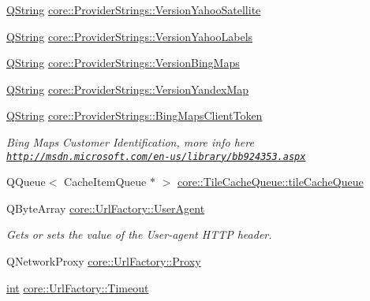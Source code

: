 \begin{DoxyCompactItemize}
\hyperlink{group___u_a_v_objects_plugin_gab9d252f49c333c94a72f97ce3105a32d}{Q\-String} \hyperlink{group___o_p_map_widget_ga41e9afc6aa6f634642d2aaa246c1a60e}{core\-::\-Provider\-Strings\-::\-Version\-Yahoo\-Satellite}
\item 
\hyperlink{group___u_a_v_objects_plugin_gab9d252f49c333c94a72f97ce3105a32d}{Q\-String} \hyperlink{group___o_p_map_widget_gae16013eddeb9d3b70af56f0e03eeab19}{core\-::\-Provider\-Strings\-::\-Version\-Yahoo\-Labels}
\item 
\hyperlink{group___u_a_v_objects_plugin_gab9d252f49c333c94a72f97ce3105a32d}{Q\-String} \hyperlink{group___o_p_map_widget_ga98d1eeb119258d3fb9fab1a550604eb0}{core\-::\-Provider\-Strings\-::\-Version\-Bing\-Maps}
\item 
\hyperlink{group___u_a_v_objects_plugin_gab9d252f49c333c94a72f97ce3105a32d}{Q\-String} \hyperlink{group___o_p_map_widget_ga4e8dc0424dc67c6a4248f5bb6a770403}{core\-::\-Provider\-Strings\-::\-Version\-Yandex\-Map}
\item 
\hyperlink{group___u_a_v_objects_plugin_gab9d252f49c333c94a72f97ce3105a32d}{Q\-String} \hyperlink{group___o_p_map_widget_ga4c3a944c12deba7b13251f0c04685ac6}{core\-::\-Provider\-Strings\-::\-Bing\-Maps\-Client\-Token}
\begin{DoxyCompactList}\small\item\em Bing Maps Customer Identification, more info here \href{http://msdn.microsoft.com/en-us/library/bb924353.aspx}{\tt http\-://msdn.\-microsoft.\-com/en-\/us/library/bb924353.\-aspx} \end{DoxyCompactList}\item 
Q\-Queue$<$ Cache\-Item\-Queue $\ast$ $>$ \hyperlink{group___o_p_map_widget_ga6bb4a109ac678df86dff7fe8a1a02944}{core\-::\-Tile\-Cache\-Queue\-::tile\-Cache\-Queue}
\item 
Q\-Byte\-Array \hyperlink{group___o_p_map_widget_ga9dbf3d049cf1947db76a0c87dd0821fc}{core\-::\-Url\-Factory\-::\-User\-Agent}
\begin{DoxyCompactList}\small\item\em Gets or sets the value of the User-\/agent H\-T\-T\-P header. \end{DoxyCompactList}\item 
Q\-Network\-Proxy \hyperlink{group___o_p_map_widget_ga4851a6205d1885048a3417f736ec8679}{core\-::\-Url\-Factory\-::\-Proxy}
\item 
\hyperlink{ioapi_8h_a787fa3cf048117ba7123753c1e74fcd6}{int} \hyperlink{group___o_p_map_widget_gaee21c04663fde2b41c6d471456dc7325}{core\-::\-Url\-Factory\-::\-Timeout}

\end{DoxyCompactItemize}
